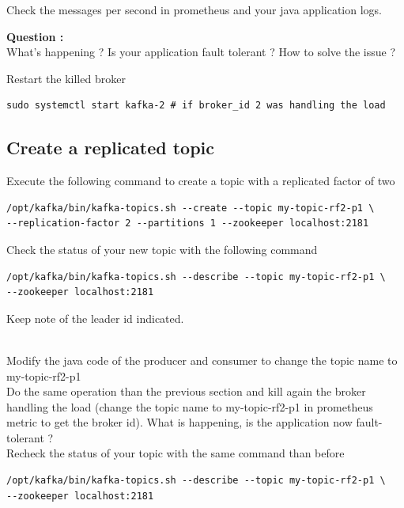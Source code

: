 \documentclass{article}
\newcounter{question}
\newenvironment{question}
    { \begin{mdframed}[backgroundcolor=gray!20] \textbf{Question \arabic{question} : } \stepcounter{question} \\}
    {  \end{mdframed}}
\newenvironment{code}
    { \begin{mdframed} }    {  \end{mdframed}}
\begin{document}
Check the messages per second in prometheus and your java application logs.

\begin{question}
 What's happening ? Is your application fault tolerant ? How to solve the issue ? 
\end{question}


Restart the killed broker 
\begin{code}
    \begin{verbatim}
sudo systemctl start kafka-2 # if broker_id 2 was handling the load \end{verbatim}
\end{code}
\subsection{Create a replicated topic}
Execute the following command to create a topic with a replicated factor of two

\begin{code}
    \begin{verbatim}
/opt/kafka/bin/kafka-topics.sh --create --topic my-topic-rf2-p1 \
--replication-factor 2 --partitions 1 --zookeeper localhost:2181 \end{verbatim}
\end{code}


Check the status of your new topic with the following command
\begin{code}
    \begin{verbatim}
/opt/kafka/bin/kafka-topics.sh --describe --topic my-topic-rf2-p1 \
--zookeeper localhost:2181 \end{verbatim}
\end{code}

Keep note of the leader id indicated.


\\
Modify the java code of the producer and consumer to change the topic name to my-topic-rf2-p1
\\


Do the same operation than the previous section and kill again the broker handling the load (change the topic name to my-topic-rf2-p1 in prometheus metric to get the broker id). What is happening, is the application now fault-tolerant ? 
\\


Recheck the status of your topic with the same command than before 
\begin{code}
    \begin{verbatim}
/opt/kafka/bin/kafka-topics.sh --describe --topic my-topic-rf2-p1 \
--zookeeper localhost:2181 \end{verbatim}
\end{code}
\end{document}
